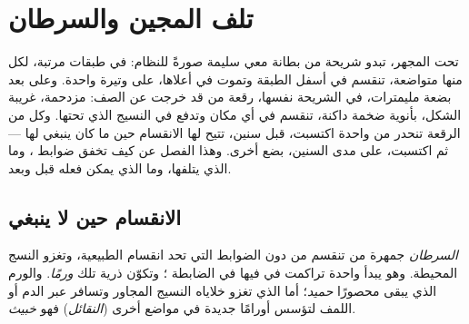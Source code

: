 \chapter{تلف المجين والسرطان}\label{ch:g11:cancer}

تحت المجهر، تبدو شريحة من بطانة معي سليمة صورةً للنظام:  في طبقات
مرتبة، لكل منها  متواضعة، تنقسم في أسفل الطبقة وتموت في أعلاها،
على وتيرة واحدة. وعلى بعد بضعة مليمترات، في الشريحة نفسها، رقعة من
 قد خرجت عن الصف: مزدحمة، غريبة الشكل، بأنوية ضخمة داكنة،
تنقسم في أي مكان وتدفع في النسيج الذي تحتها. وكل  من الرقعة تنحدر
من  واحدة اكتسبت، قبل سنين،  تتيح لها الانقسام حين ما كان
ينبغي لها --- ثم اكتسبت، على مدى السنين، بضع  أخرى. وهذا الفصل عن
كيف تخفق ضوابط ، وما الذي يتلفها، وما الذي يمكن فعله
قبل وبعد.

\section{الانقسام حين لا ينبغي}

\begin{definition}[السرطان]\label{def:g11:cancer:cancer}
\emph{السرطان} جمهرة من  تنقسم من دون الضوابط التي
تحد انقسام  الطبيعية، وتغزو النسج المحيطة. وهو يبدأ  واحدة
تراكمت في  فيها  في  الضابطة ؛ وتكوّن
ذرية تلك  \emph{ورمًا}. والورم الذي يبقى محصورًا
\emph{حميد}؛ أما الذي تغزو خلاياه النسيج المجاور وتسافر عبر الدم أو
اللمف لتؤسس أورامًا جديدة في مواضع أخرى (\emph{النقائل}) فهو
\emph{خبيث}.
\end{definition}

